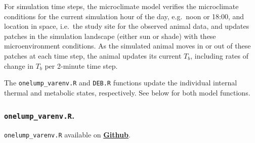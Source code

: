 \documentclass[]{article}
\let\oldsubparagraph\subparagraph
\renewcommand{\subparagraph}[1]{\oldsubparagraph{#1}\mbox{}}
\begin{document}
For simulation time steps, the microclimate model verifies the
microclimate conditions for the current simulation hour of the day,
e.g.~noon or 18:00, and location in space, i.e.~the study site for the
observed animal data, and updates patches in the simulation landscape
(either sun or shade) with these microenvironment conditions. As the
simulated animal moves in or out of these patches at each time step, the
animal updates its current \(T_b\), including rates of change in \(T_b\)
per 2-minute time step.

The \texttt{onelump\_varenv.R} and \texttt{DEB.R} functions update the
individual internal thermal and metabolic states, respectively. See
below for both model functions.

\subparagraph{}\label{section-2}

\subsubsection{\texorpdfstring{\texttt{onelump\_varenv.R}.}{onelump\_varenv.R.}}\label{onelump_varenv.r.}

\texttt{onelump\_varenv.R} available on
\href{https://github.com/darwinanddavis/MalishevBullKearney/blob/master/onelump_varenv.R}{\textbf{Github}}.
\end{document}

